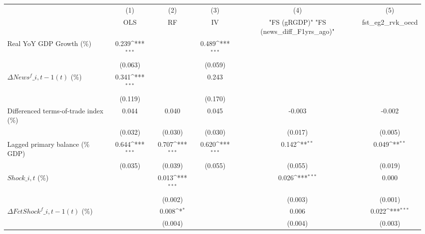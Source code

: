 {
\def\sym#1{\ifmmode^{#1}\else\(^{#1}\)\fi}
\begin{tabular}{l*{5}{c}}
\toprule
                    &\multicolumn{1}{c}{(1)}&\multicolumn{1}{c}{(2)}&\multicolumn{1}{c}{(3)}&\multicolumn{1}{c}{(4)}&\multicolumn{1}{c}{(5)}\\
                    &\multicolumn{1}{c}{OLS}&\multicolumn{1}{c}{RF}&\multicolumn{1}{c}{IV}&\multicolumn{1}{c}{ "FS (gRGDP)"  "FS (news\_diff\_F1yrs\_ago)" }&\multicolumn{1}{c}{fst\_eg2\_rvk\_oecd}\\
\midrule
Real YoY GDP Growth (\%)&       0.239\sym{***}&                     &       0.489\sym{***}&                     &                     \\
                    &     (0.063)         &                     &     (0.059)         &                     &                     \\
\addlinespace
$ \Delta News^f\_{i,t-1}(t)$ (\%)&       0.341\sym{***}&                     &       0.243         &                     &                     \\
                    &     (0.119)         &                     &     (0.170)         &                     &                     \\
\addlinespace
Differenced terms-of-trade index (\%)&       0.044         &       0.040         &       0.045         &      -0.003         &      -0.002         \\
                    &     (0.032)         &     (0.030)         &     (0.030)         &     (0.017)         &     (0.005)         \\
\addlinespace
Lagged primary balance (\% GDP)&       0.644\sym{***}&       0.707\sym{***}&       0.620\sym{***}&       0.142\sym{**} &       0.049\sym{**} \\
                    &     (0.035)         &     (0.039)         &     (0.055)         &     (0.055)         &     (0.019)         \\
\addlinespace
$ Shock\_{i,t}$ (\%) &                     &       0.013\sym{***}&                     &       0.026\sym{***}&       0.000         \\
                    &                     &     (0.002)         &                     &     (0.003)         &     (0.001)         \\
\addlinespace
$ \Delta FctShock^f\_{i,t-1}(t)$ (\%)&                     &       0.008\sym{*}  &                     &       0.006         &       0.022\sym{***}\\
                    &                     &     (0.004)         &                     &     (0.004)         &     (0.003)         \\

\end{tabular}}
